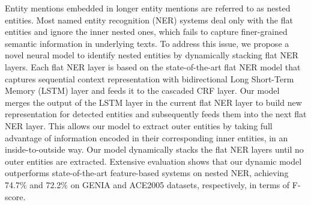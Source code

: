 Entity mentions embedded in longer entity mentions are referred to as nested entities. Most named entity recognition (NER) systems deal only with the flat entities and ignore the inner nested ones, which fails to capture finer-grained semantic information in underlying texts. To address this issue, we propose a novel neural model to identify nested entities by dynamically stacking flat NER layers. Each flat NER layer is based on the state-of-the-art flat NER model that captures sequential context representation with bidirectional Long Short-Term Memory (LSTM) layer and feeds it to the cascaded CRF layer. Our model merges the output of the LSTM layer in the current flat NER layer to build new representation for detected entities and subsequently feeds them into the next flat NER layer. This allows our model to extract outer entities by taking full advantage of information encoded in their corresponding inner entities, in an inside-to-outside way. Our model dynamically stacks the flat NER layers until no outer entities are extracted. Extensive evaluation shows that our dynamic model outperforms state-of-the-art feature-based systems on nested NER, achieving 74.7\% and 72.2\% on GENIA and ACE2005 datasets, respectively, in terms of F-score.

